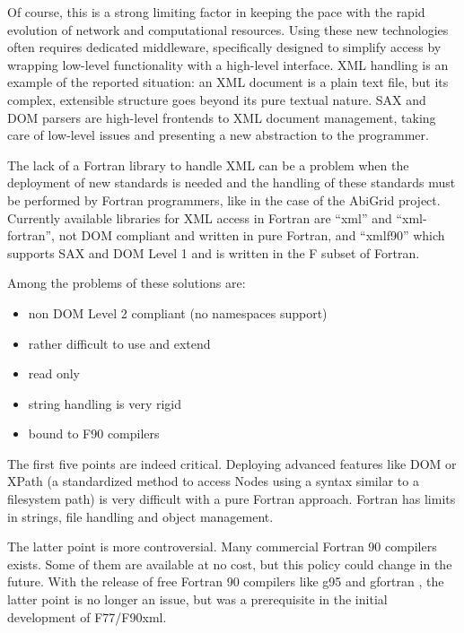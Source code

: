 Of course, this is a strong limiting factor in keeping the pace with the
rapid evolution of network and computational resources. Using these new
technologies often requires dedicated middleware, specifically designed to
simplify access by wrapping low-level functionality with a high-level
interface. XML handling is an example of the reported situation: an XML
document is a plain text file, but its complex, extensible structure goes beyond
its pure textual nature. SAX and DOM parsers are high-level frontends to XML
document management, taking care of low-level issues and presenting a new
abstraction to the programmer.

The lack of a Fortran library to handle XML can be a problem when the
deployment of new standards is needed and the handling of these standards
must be performed by Fortran programmers, like in the case of the AbiGrid
project. Currently available libraries for XML access in Fortran are
``xml''\cite{xmllib-site} and {``xml-fortran''}\cite{xml-fortran-site}, 
not DOM compliant and written in pure Fortran, and ``xmlf90''
\cite{xmlf90-site} which supports SAX and DOM Level 1 and is written in the
F subset of Fortran.

Among the problems of these solutions are:

\begin{itemize}
\item non DOM Level 2 compliant (no namespaces support)
\item rather difficult to use and extend
\item read only
\item string handling is very rigid
\item bound to F90 compilers
\end{itemize}

The first five points are indeed critical. Deploying advanced features like
DOM or XPath (a standardized method to access Nodes using a syntax similar
to a filesystem path) is very difficult with a pure Fortran approach.
Fortran has limits in strings, file handling and object management.

The latter point is more controversial. Many commercial Fortran 90 compilers
exists. Some of them are available at no cost, but this policy could change
in the future. With the release of free Fortran 90 compilers like g95
\cite{g95-site} and gfortran \cite{gfortran-site}, the latter point is no
longer an issue, but was a prerequisite in the initial development of
F77/F90xml.
